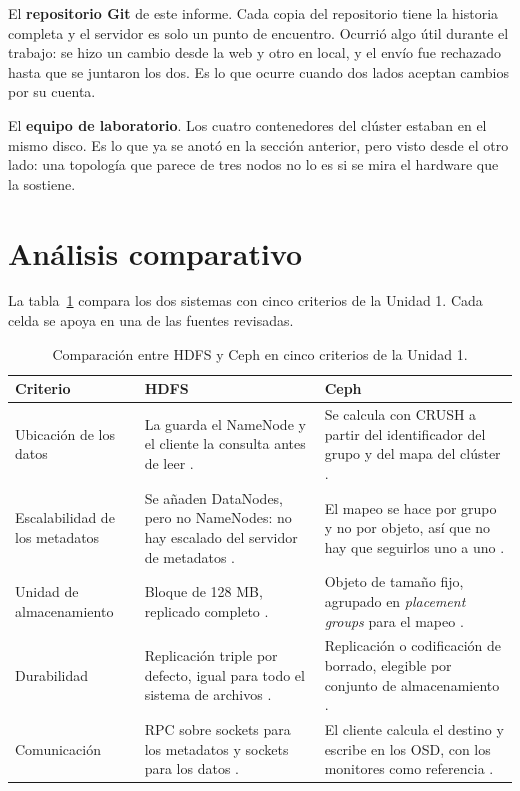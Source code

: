 \documentclass[12pt,a4paper]{article}
\begin{document}
El \textbf{repositorio Git} de este informe. Cada copia del repositorio tiene la historia completa y el servidor es solo un punto de encuentro. Ocurrió algo útil durante el trabajo: se hizo un cambio desde la web y otro en local, y el envío fue rechazado hasta que se juntaron los dos. Es lo que ocurre cuando dos lados aceptan cambios por su cuenta.

El \textbf{equipo de laboratorio}. Los cuatro contenedores del clúster estaban en el mismo disco. Es lo que ya se anotó en la sección anterior, pero visto desde el otro lado: una topología que parece de tres nodos no lo es si se mira el hardware que la sostiene.

\section{Análisis comparativo}

La tabla~\ref{tab:comp} compara los dos sistemas con cinco criterios de la Unidad 1. Cada celda se apoya en una de las fuentes revisadas.

\begin{table}[H]
\centering
\small
\caption{Comparación entre HDFS y Ceph en cinco criterios de la Unidad 1.}
\label{tab:comp}
\begin{tabular}{@{}>{\raggedright\arraybackslash}p{3.5cm}>{\raggedright\arraybackslash}p{5.5cm}>{\raggedright\arraybackslash}p{5.5cm}@{}}
\toprule
Criterio & HDFS & Ceph \\
\midrule
Ubicación de los datos &
La guarda el NameNode y el cliente la consulta antes de leer \cite[p.~2830]{dhulavvagol2023performance}. &
Se calcula con CRUSH a partir del identificador del grupo y del mapa del clúster \cite[p.~1128]{li2023ceph}. \\
\addlinespace
Escalabilidad de los metadatos &
Se añaden DataNodes, pero no NameNodes: no hay escalado del servidor de metadatos \cite[p.~2830]{dhulavvagol2023performance}. &
El mapeo se hace por grupo y no por objeto, así que no hay que seguirlos uno a uno \cite[p.~4]{chum2021supporting}. \\
\addlinespace
Unidad de almacenamiento &
Bloque de 128 MB, replicado completo \cite[p.~1]{tchaye2019hpf}. &
Objeto de tamaño fijo, agrupado en \emph{placement groups} para el mapeo \cite[p.~1128]{li2023ceph}. \\
\addlinespace
Durabilidad &
Replicación triple por defecto, igual para todo el sistema de archivos \cite[p.~1]{tchaye2019hpf}. &
Replicación o codificación de borrado, elegible por conjunto de almacenamiento \cite[p.~3]{kim2021erasure}. \\
\addlinespace
Comunicación &
RPC sobre sockets para los metadatos y sockets para los datos \cite[p.~11]{tchaye2019hpf}. &
El cliente calcula el destino y escribe en los OSD, con los monitores como referencia \cite[p.~1128]{li2023ceph}. \\
\bottomrule
\end{tabular}
\end{table}
\end{document}
